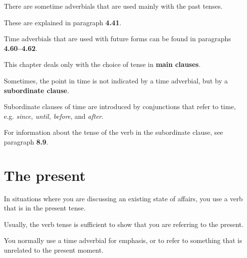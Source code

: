 \documentclass[oneside]{book}
\numberwithin{equation}{section}
\begin{document}
%
There are sometime adverbials that are used mainly with the past tenses.

These are explained in paragraph \textbf{4.41}.

Time adverbials that are used with future forms can be found in paragraphs \textbf{4.60--4.62}.

%
\noindent{} This chapter deals only with the choice of tense in \textbf{main clauses}.

%
Sometimes, the point in time is not indicated by a time adverbial, but by a \textbf{subordinate clause}.

Subordinate clauses of time are introduced by conjunctions that refer to time, e.g. \textit{since, until, before}, and \textit{after}.

%
For information about the tense of the verb in the subordinate clause, see paragraph \textbf{8.9}.

\section{The present}
\noindent{} In situations where you are discussing an existing state of affairs, you use a verb that is in the present tense.

Usually, the verb tense is sufficient to show that you are referring to the present.

You normally use a time adverbial for emphasis, or to refer to something that is unrelated to the present moment.
\end{document}

